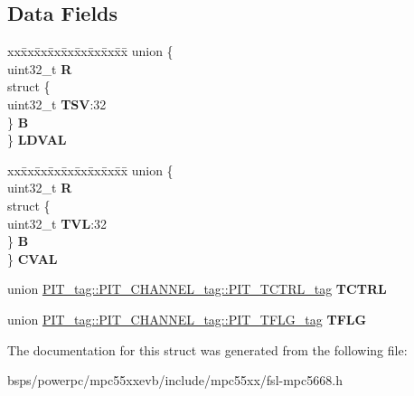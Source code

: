 \subsection*{Data Fields}
\begin{DoxyCompactItemize}
\item 
\mbox{\label{structPIT__tag_1_1PIT__CHANNEL__tag_ab48bfdf40c450cafe549fe94cfabed43}} 
\begin{tabbing}
xx\=xx\=xx\=xx\=xx\=xx\=xx\=xx\=xx\=\kill
union \{\\
\>uint32\_t {\bfseries R}\\
\>struct \{\\
\>\>uint32\_t {\bfseries TSV}:32\\
\>\} {\bfseries B}\\
\} {\bfseries LDVAL}\\

\end{tabbing}\item 
\mbox{\label{structPIT__tag_1_1PIT__CHANNEL__tag_adfb398b0c7966e3a821f43e57f5c57d6}} 
\begin{tabbing}
xx\=xx\=xx\=xx\=xx\=xx\=xx\=xx\=xx\=\kill
union \{\\
\>uint32\_t {\bfseries R}\\
\>struct \{\\
\>\>uint32\_t {\bfseries TVL}:32\\
\>\} {\bfseries B}\\
\} {\bfseries CVAL}\\

\end{tabbing}\item 
\mbox{\label{structPIT__tag_1_1PIT__CHANNEL__tag_aa825a6d3d9efc2b941dd1c4378737b2e}} 
union \mbox{\hyperlink{unionPIT__tag_1_1PIT__CHANNEL__tag_1_1PIT__TCTRL__tag}{P\+I\+T\+\_\+tag\+::\+P\+I\+T\+\_\+\+C\+H\+A\+N\+N\+E\+L\+\_\+tag\+::\+P\+I\+T\+\_\+\+T\+C\+T\+R\+L\+\_\+tag}} {\bfseries T\+C\+T\+RL}
\item 
\mbox{\label{structPIT__tag_1_1PIT__CHANNEL__tag_af85bd710fd54d5fdd1af991b09d9bc4f}} 
union \mbox{\hyperlink{unionPIT__tag_1_1PIT__CHANNEL__tag_1_1PIT__TFLG__tag}{P\+I\+T\+\_\+tag\+::\+P\+I\+T\+\_\+\+C\+H\+A\+N\+N\+E\+L\+\_\+tag\+::\+P\+I\+T\+\_\+\+T\+F\+L\+G\+\_\+tag}} {\bfseries T\+F\+LG}
\end{DoxyCompactItemize}


The documentation for this struct was generated from the following file\+:\begin{DoxyCompactItemize}
\item 
bsps/powerpc/mpc55xxevb/include/mpc55xx/fsl-\/mpc5668.\+h\end{DoxyCompactItemize}
